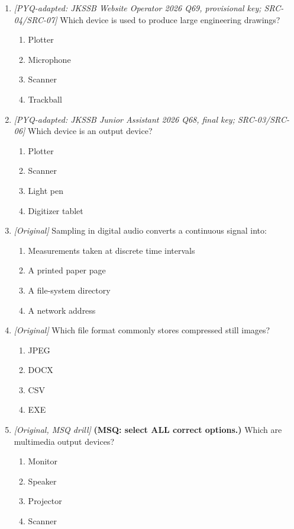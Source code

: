 \begin{enumerate}[label=\textbf{Q\arabic*.}, leftmargin=*]
  \begin{enumerate}[label=\Alph*.]
    \item .jpg -- image
    \item .mp3 -- audio
    \item .mp4 -- video
    \item .jpg -- spreadsheet
  \end{enumerate}
\item \textit{[PYQ-adapted: JKSSB Website Operator 2026 Q69, provisional key; SRC-04/SRC-07]} Which device is used to produce large engineering drawings?
  \begin{enumerate}[label=\Alph*.]
\item Plotter
   \item Microphone
   \item Scanner
   \item Trackball
  \end{enumerate}

\item \textit{[PYQ-adapted: JKSSB Junior Assistant 2026 Q68, final key; SRC-03/SRC-06]} Which device is an output device?
  \begin{enumerate}[label=\Alph*.]
\item Plotter
   \item Scanner
   \item Light pen
   \item Digitizer tablet
  \end{enumerate}

\item \textit{[Original]} Sampling in digital audio converts a continuous signal into:
  \begin{enumerate}[label=\Alph*.]
\item Measurements taken at discrete time intervals
   \item A printed paper page
   \item A file-system directory
   \item A network address
  \end{enumerate}

\item \textit{[Original]} Which file format commonly stores compressed still images?
  \begin{enumerate}[label=\Alph*.]
\item JPEG
   \item DOCX
   \item CSV
   \item EXE
  \end{enumerate}

\item \textit{[Original, MSQ drill]} \textbf{(MSQ: select ALL correct options.)} Which are multimedia output devices?
  \begin{enumerate}[label=\Alph*.]
\item Monitor
   \item Speaker
   \item Projector
   \item Scanner
  \end{enumerate}

\end{enumerate}
